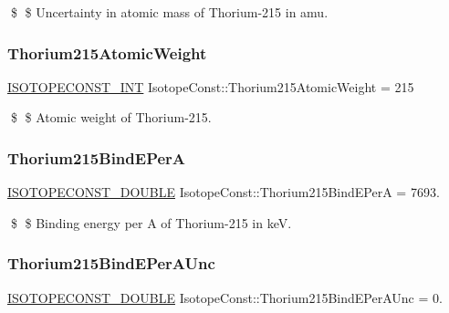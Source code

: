 \$ \$ Uncertainty in atomic mass of Thorium-\/215 in amu. \mbox{\label{group___isotope_const-_thorium-_th215_ga0bf24e0c7119b22cc3009e84c8321419}} 
\subsubsection{\texorpdfstring{Thorium215\+Atomic\+Weight}{Thorium215AtomicWeight}}
{\footnotesize\ttfamily \mbox{\hyperlink{group___isotope_const-_macros_ga5f18360b3e99483a35c32d789e62621c}{I\+S\+O\+T\+O\+P\+E\+C\+O\+N\+S\+T\+\_\+\+I\+NT}} Isotope\+Const\+::\+Thorium215\+Atomic\+Weight = 215}

\$ \$ Atomic weight of Thorium-\/215. \mbox{\label{group___isotope_const-_thorium-_th215_ga32eb1474dae70c6a8fae3fd396eb1117}} 
\subsubsection{\texorpdfstring{Thorium215\+Bind\+E\+PerA}{Thorium215BindEPerA}}
{\footnotesize\ttfamily \mbox{\hyperlink{group___isotope_const-_macros_ga8f45a7272ce02c0b4c65c44636ed719a}{I\+S\+O\+T\+O\+P\+E\+C\+O\+N\+S\+T\+\_\+\+D\+O\+U\+B\+LE}} Isotope\+Const\+::\+Thorium215\+Bind\+E\+PerA = 7693.}

\$ \$ Binding energy per A of Thorium-\/215 in keV. \mbox{\label{group___isotope_const-_thorium-_th215_ga01f677b49c81292691608681cadbfc07}} 
\subsubsection{\texorpdfstring{Thorium215\+Bind\+E\+Per\+A\+Unc}{Thorium215BindEPerAUnc}}
{\footnotesize\ttfamily \mbox{\hyperlink{group___isotope_const-_macros_ga8f45a7272ce02c0b4c65c44636ed719a}{I\+S\+O\+T\+O\+P\+E\+C\+O\+N\+S\+T\+\_\+\+D\+O\+U\+B\+LE}} Isotope\+Const\+::\+Thorium215\+Bind\+E\+Per\+A\+Unc = 0.}

